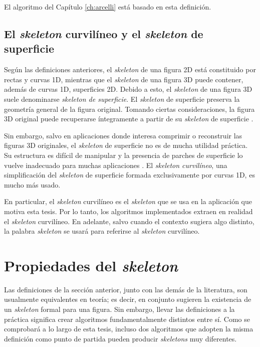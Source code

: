 El algoritmo del Capítulo \ref{ch:arcelli} está basado en esta definición.

\subsection{El \textit{skeleton} curvilíneo y el \textit{skeleton} de superficie}

Según las definiciones anteriores, el \textit{skeleton} de una figura 2D está constituido por rectas y curvas 1D, mientras que el \textit{skeleton} de una figura 3D puede contener, además de curvas 1D, superficies 2D. Debido a esto, el \textit{skeleton} de una figura 3D suele denominarse \textit{skeleton de superficie}. El \textit{skeleton} de superficie preserva la geometría general de la figura original. Tomando ciertas consideraciones, la figura 3D original puede recuperarse íntegramente a partir de su \textit{skeleton} de superficie \cite{borgefors1999computing}.

Sin embargo, salvo en aplicaciones donde interesa comprimir o reconstruir las figuras 3D originales, el \textit{skeleton} de superficie no es de mucha utilidad práctica. Su estructura es difícil de manipular y la presencia de parches de superficie lo vuelve inadecuado para muchas aplicaciones \cite{huang2013l1}. El \textit{skeleton curvilíneo}, una simplificación del \textit{skeleton} de superficie formada exclusivamente por curvas 1D, es mucho más usado. 

En particular, el \textit{skeleton} curvilíneo es el \textit{skeleton} que se usa en la aplicación que motiva esta tesis. Por lo tanto, los algoritmos implementados extraen en realidad el \textit{skeleton} curvilíneo. En adelante, salvo cuando el contexto sugiera algo distinto, la palabra \textit{skeleton} se usará para referirse al \textit{skeleton} curvilíneo.

\section{Propiedades del \textit{skeleton}} \label{sec:skelprops}

Las definiciones de la sección anterior, junto con las demás de la literatura, son usualmente equivalentes en teoría; es decir, en conjunto sugieren la existencia de un \textit{skeleton} formal para una figura. Sin embargo, llevar las definiciones a la práctica significa crear algoritmos fundamentalmente distintos entre sí. Como se comprobará a lo largo de esta tesis, incluso dos algoritmos que adopten la misma definición como punto de partida pueden producir \textit{skeletons} muy diferentes.

